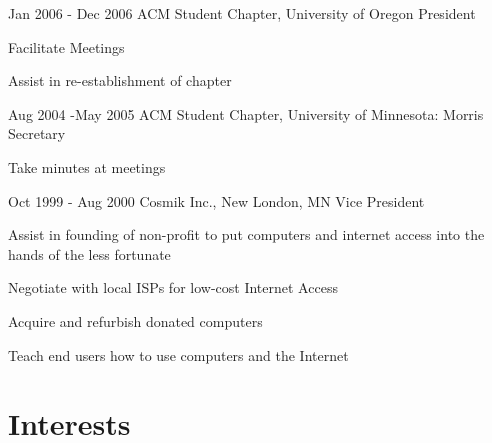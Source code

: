 \documentclass[10pt]{article} %
\begin{document}
\job
{Jan 2006 - }{Dec 2006}
{ACM Student Chapter, University of Oregon}
{}
{President}
{
\begin{itemize-noindent}
\setlength\itemsep{0.12em}
\item{Facilitate Meetings}
\item{Assist in re-establishment of chapter}
\end{itemize-noindent}
}

\job
{Aug 2004 -}{May 2005}
{ACM Student Chapter, University of Minnesota: Morris}
{}
{Secretary}
{
\begin{itemize-noindent}
\setlength\itemsep{0.12em}
\item{Take minutes at meetings}
\end{itemize-noindent}
}

\job
{Oct 1999 - }{Aug 2000}
{Cosmik Inc., New London, MN}
{}
{Vice President}
{

\begin{itemize-noindent}
\setlength\itemsep{0.12em}
\item{Assist in founding of non-profit to put computers and internet access into the hands of the less fortunate}
\item{Negotiate with local ISPs for low-cost Internet Access}
\item{Acquire and refurbish donated computers}
\item{Teach end users how to use computers and the Internet}
\end{itemize-noindent}
}


\section{Interests}


\end{document}
